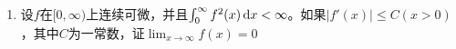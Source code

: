 \begin{enumerate}
\item 设$f$在$[0,\infty)$上连续可微，并且$\int_0^{\infty}f^2(x)\,\mathrm{d} x<\infty$。如果$|f'(x)|\leq C(x>0)$，其中$C$为一常数，证$\lim_{x \to \infty}f(x)=0$



































\end{enumerate}